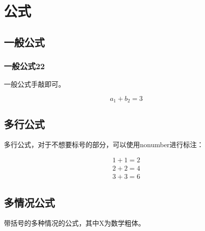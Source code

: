 \documentclass[AutoFakeBold]{LZUThesis-PgD&PhD}
\begin{document}
\section{公式}

\subsection{一般公式}
\subsubsection{一般公式22}

一般公式手敲即可。



\begin{equation}\label{eq:sip}
  a_1 + b_2 = 3
\end{equation}


\subsection{多行公式}

多行公式，对于不想要标号的部分，可以使用nonumber进行标注：


\begin{gather}\label{eq:add}
  1+1=2 \\
  2+2=4 \\
  3+3=6 \nonumber
\end{gather}

\subsection{多情况公式}
带括号的多种情况的公式，其中X为数学粗体。

\end{document}

